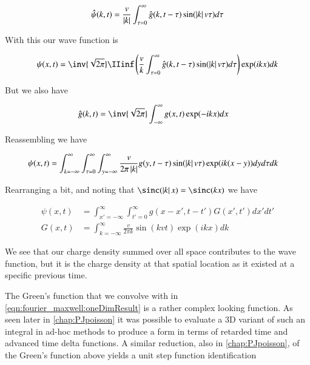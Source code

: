\begin{align*}
\hat{\psi}(k, t) = \frac{v}{\left\lvert{k}\right\rvert} \int_{\tau = 0}^\infty \hat{g}(k, t-\tau) \sin( \left\lvert{k}\right\rvert v \tau ) d\tau
\end{align*}

With this our wave function is

\begin{align*}
{\psi}(x, t)
&=
\inv{\sqrt{2\pi}} \IIinf
\left(
\frac{v}{k} \int_{\tau = 0}^\infty \hat{g}(k, t-\tau) \sin( \Abs{k} v \tau ) d\tau
\right) \exp( i k x ) dk \\
\end{align*}


But we also have

\begin{align*}
\hat{g}(k,t) &= \inv{\sqrt{2\pi}} \int_{-\infty}^\infty {g}(x, t) \exp( -i k x ) dx
\end{align*}

Reassembling we have

\begin{align*}
{\psi}(x, t)
&= 
\int_{k = -\infty}^\infty
\int_{\tau = 0}^\infty
\int_{y=-\infty}^\infty
\frac{v}{ 2 \pi \left\lvert{k}\right\rvert}
{g}(y, t-\tau) 
\sin( \left\lvert{k}\right\rvert v \tau ) 
\exp( i k (x-y) ) 
dy
d\tau
dk
\end{align*}

Rearranging a bit, and noting that $\sinc(\Abs{k}x) = \sinc(kx)$ we have

\begin{align}\label{eqn:fourier_maxwell:oneDimResult}
{\psi}(x, t)
&=
\int_{x'=-\infty}^\infty
\int_{t' = 0}^\infty {g}(x-x', t-t') G(x', t') dx' dt' \\
G(x, t) &=
\int_{k = -\infty}^\infty
\frac{v}{2\pi {k}}
\sin( {k} v t )
\exp( i k x )
dk
\end{align}

We see that our charge density summed over all space contributes to the wave function, but it is the charge density at that spatial location as it existed at a specific previous time.

The Green's function that we convolve with in \ref{eqn:fourier_maxwell:oneDimResult}
is a rather complex looking function.  As seen later in 
\ref{chap:PJpoisson} it was possible to evaluate a 3D variant of such an integral in
ad-hoc methods to produce a form in terms of retarded time and advanced time delta
functions.  A similar reduction, also in \ref{chap:PJpoisson},
of the Green's function above yields a unit step function identification


